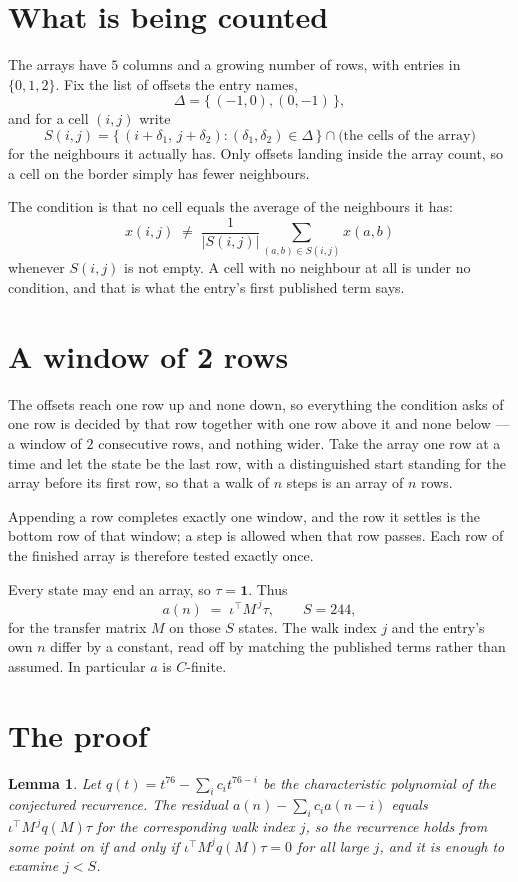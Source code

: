 \documentclass[11pt,a4paper]{article}
\theoremstyle{plain}
\newtheorem{lemma}[theorem]{Lemma}
\theoremstyle{definition}
\begin{document}
\section{What is being counted}

The arrays have $5$ columns and a growing number of rows, with entries in $\{0,1,2\}$. Fix the
list of offsets the entry names,
\[
\Delta=\{\,(-1,0), (0,-1)\,\},
\]
and for a cell $(i,j)$ write
\[
S(i,j)=\{\,(i+\delta_1,\,j+\delta_2) : (\delta_1,\delta_2)\in\Delta\,\}\cap
\text{(the cells of the array)}
\]
for the neighbours it actually has. Only offsets landing inside the array count, so a cell on
the border simply has fewer neighbours.

The condition is that no cell equals the average of the neighbours it has:
\[
x(i,j)\;\neq\;\frac{1}{|S(i,j)|}\sum_{(a,b)\in S(i,j)}x(a,b)
\]
whenever $S(i,j)$ is not empty. A cell with no neighbour at all is under no condition, and that is what the entry's first published term says.

\section{A window of 2 rows}

The offsets reach one row up and none down, so everything the condition asks of one row is
decided by that row together with one row above it and none below --- a window of
$2$ consecutive rows, and nothing wider. Take the array one row at a time
and let the state be the last row, with a distinguished start standing for the
array before its first row, so that a walk of $n$ steps is an array of $n$ rows.

Appending a row completes exactly one window, and the row it settles is the bottom row of that window; a step is
allowed when that row passes. Each row of the finished
array is therefore tested exactly once.

Every state may end an array, so $\tau=\mathbf{1}$.
Thus
\[
a(n)\;=\;\iota^{\!\top}M^{\,j}\tau ,\qquad S=244,
\]
for the transfer matrix $M$ on those $S$ states. The walk index $j$ and the entry's own $n$
differ by a constant, read off by matching the published terms rather than assumed. In
particular $a$ is $C$-finite.

\section{The proof}

\begin{lemma}\label{lem:crit}
Let $q(t)=t^{76}-\sum_i c_it^{76-i}$ be the characteristic polynomial of the
conjectured recurrence. The residual $a(n)-\sum_ic_ia(n-i)$ equals
$\iota^{\!\top}M^{\,j}q(M)\tau$ for the corresponding walk index $j$, so the recurrence
holds from some point on if and only if $\iota^{\!\top}M^{j}q(M)\tau=0$ for all large $j$,
and it is enough to examine $j<S$.
\end{lemma}
\end{document}

